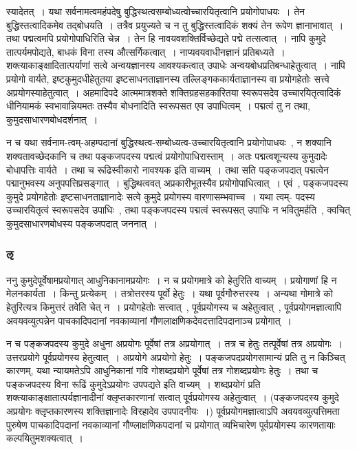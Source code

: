 				\begin{small}

					स्यादेतत्~। यथा सर्वनामत्वमहंपदेषु बुद्धिस्थत्वसम्बोध्यत्वोच्चारयितृत्वानि प्रयोगोपाधयः~। तेन बुद्धिस्तत्वादिकमेव तद्बोधयति~। तत्रैव प्रयुज्यते च न तु बुद्धिस्तत्वादिकं शक्यं तेन रूपेण ज्ञानाभावात्~। तथा पद्मत्वमपि प्रयोगोपाधिरिति चेन्न~। तेन हि नावयवशक्तिर्विच्छेद्यते पद्मे तत्सत्वात्~। नापि कुमुदे तात्पर्यमपोद्यते, बाधकं विना तस्य औत्सर्गिकत्वात्~। नाप्यवयवाधीनज्ञानं प्रतिबध्यते~। शक्त्याकाङ्क्षादितात्पर्याणां सत्वे अन्वयज्ञानस्य आवश्यकत्वात् उपाधेः अन्वयबोधप्रतिबन्धाहेतुत्वात्~। नापि प्रयोगो वार्यते, इष्टकुमुदधीहेतुतया इष्टसाधनताज्ञानस्य तल्लिङ्गककार्यताज्ञानस्य वा प्रयोगहेतोः सत्त्वे अप्रयोगस्याहेतुत्वात्~। अहमादिपदे आत्ममात्रशक्ते शक्तिग्रहसहकारितया स्वरूपसदेव उच्चारयितृत्वादिकं धीनियामकं स्वभावान्नियमतः तस्यैव बोधनादिति स्वरूपसत एव उपाधित्वम्~। पद्मत्वं तु न तथा, कुमुदसाधारणबोधदर्शनात्~। 
				\end{small}

				न च यथा सर्वनाम-त्वम्-अहम्पदानां बुद्धिस्थत्व-सम्बोध्यत्व-उच्चारयितृत्वानि प्रयोगोपाधयः~, न शक्यानि शक्यतावच्छेदकानि च तथा पङ्कजपदस्य पद्मत्वं प्रयोगोपाधिरास्ताम्~। अतः पद्मत्वशून्यस्य कुमुदादेः बोधापत्तिः वार्यते~। तथा च रूढिस्वीकारो नावश्यक इति वाच्यम्~। तथा सति पङ्कजपदात् पद्मत्वेन पद्मानुभवस्य अनुपपत्तिप्रसङ्गात्~। बुद्धिथत्ववत् अप्रकारीभूतस्यैव प्रयोगोपाधित्वात्~। एवं~, पङ्कजपदस्य कुमुदे प्रयोगहेतोः इष्टसाधनताज्ञानादेः सत्वे कुमुदे प्रयोगस्य वारणासम्भवाच्च~। यथा त्वम्- पदस्य उच्चारयितृत्वं स्वरूपसदेव उपाधिः~, तथा पङ्कजपदस्य पद्मत्वं स्वरूपसत् उपाधिः न भवितुमर्हति~, क्वचित् कुमुदसाधारणबोधस्य पङ्कजपदात् जननात्~। 

			\subsubsection{ऌ}

				\begin{small}

					ननु कुमुदेपूर्वेषामप्रयोगात् आधुनिकानामप्रयोगः~। न च प्रयोगमात्रे को हेतुरिति वाच्यम्~। प्रयोगाणां हि न मेलनकार्यता~। किन्तु प्रत्येकम्~। तत्रोत्तरस्य पूर्वो हेतुः~। यथा पूर्वगौरुत्तरस्य~। अन्यथा गोमात्रे को हेतुरित्यत्र किमुत्तरं तवेति चेत् न~। प्रयोगहेतोः सत्त्वात्~, पूर्वप्रयोगस्य च अहेतुत्वात्~, पूर्वप्रयोगमज्ञात्वापि अवयवव्युत्पन्नेन पाचकादिपदानां नवकाव्यानां गौणलाक्षणिकदेवदत्तादिपदानाञ्च प्रयोगात्~। 
				\end{small}
			
				न च पङ्कजपदस्य कुमुदे अधुना अप्रयोगः पूर्वेषां तत्र अप्रयोगात्~। तत्र च हेतुः तत्पूर्वेषां तत्र अप्रयोगः~। उत्तरप्रयोगे  पूर्वप्रयोगस्य हेतुत्वात्~। अप्रयोगे अप्रयोगो हेतुः~। पङ्कजपदप्रयोगसामान्यं प्रति तु न किञ्चित् कारणम्, यथा न्यायमतेऽपि  आधुनिकानां गवि गोशब्दप्रयोगे पूर्वेषां तत्र गोशब्दप्रयोगः हेतुः~। तथा च पङ्कजपदस्य विना रूढिं  कुमुदेऽप्रयोगः उपपद्यते इति वाच्यम्~। शब्दप्रयोगं प्रति शक्त्याकाङ्क्षातात्पर्यज्ञानादीनां क्लृप्तकारणानां सत्वात् पूर्वप्रयोगस्य अहेतुत्वात्~। (पङ्कजपदस्य कुमुदे अप्रयोगः क्लृप्तकारणस्य शक्तिज्ञानादेः विरहादेव उपपादनीयः~।) पूर्वप्रयोगमज्ञात्वाऽपि अवयवव्युत्पत्तिमता पुरुषेण पाचकादिपदानां नवकाव्यानां गौण्लाक्षणिकपदानां च प्रयोगात् व्यभिचारेण पूर्वप्रयोगस्य कारणतायाः कल्पयितुमशक्यत्वात्~।
			
